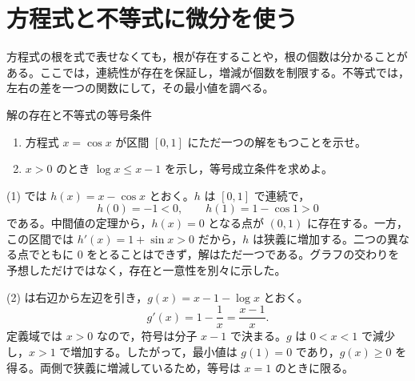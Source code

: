 \section{方程式と不等式に微分を使う}\label{節:微分方程式不等式}
方程式の根を式で表せなくても，根が存在することや，根の個数は分かることがある。ここでは，連続性が存在を保証し，増減が個数を制限する。不等式では，左右の差を一つの関数にして，その最小値を調べる。

\begin{example}{解の存在と不等式の等号条件}
\begin{enumerate}[label=(\arabic*),leftmargin=*]
 \item 方程式 $x=\cos x$ が区間 $[0,1]$ にただ一つの解をもつことを示せ。
 \item $x>0$ のとき $\log x\le x-1$ を示し，等号成立条件を求めよ。
\end{enumerate}
\end{example}
(1) では $h(x)=x-\cos x$ とおく。$h$ は $[0,1]$ で連続で，
\[
 h(0)=-1<0,\qquad h(1)=1-\cos1>0
\]
である。中間値の定理から，$h(x)=0$ となる点が $(0,1)$ に存在する。一方，この区間では $h'(x)=1+\sin x>0$ だから，$h$ は狭義に増加する。二つの異なる点でともに $0$ をとることはできず，解はただ一つである。グラフの交わりを予想しただけではなく，存在と一意性を別々に示した。

(2) は右辺から左辺を引き，$g(x)=x-1-\log x$ とおく。
\[
 g'(x)=1-\frac1x=\frac{x-1}{x}.
\]
定義域では $x>0$ なので，符号は分子 $x-1$ で決まる。$g$ は $0<x<1$ で減少し，$x>1$ で増加する。したがって，最小値は $g(1)=0$ であり，$g(x)\ge0$ を得る。両側で狭義に増減しているため，等号は $x=1$ のときに限る。

